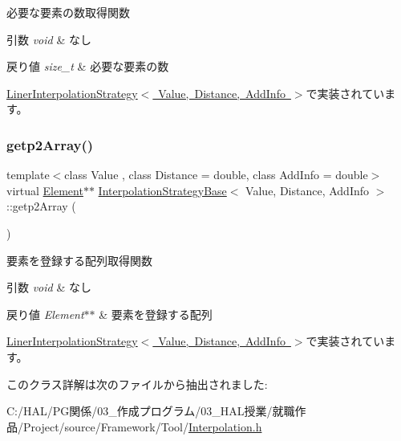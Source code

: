 必要な要素の数取得関数 


\begin{DoxyParams}{引数}
{\em void} & なし \\
\hline
\end{DoxyParams}

\begin{DoxyRetVals}{戻り値}
{\em size\+\_\+t} & 必要な要素の数 \\
\hline
\end{DoxyRetVals}


\mbox{\hyperlink{class_liner_interpolation_strategy_ab0685e841d7054a8e040e0d2b9fabc68}{Liner\+Interpolation\+Strategy$<$ Value, Distance, Add\+Info $>$}}で実装されています。

\mbox{\label{class_interpolation_strategy_base_aaccab96eb4f508e64a7a70f85c0e8d6a}} 
\subsubsection{\texorpdfstring{getp2\+Array()}{getp2Array()}}
{\footnotesize\ttfamily template$<$class Value , class Distance  = double, class Add\+Info  = double$>$ \\
virtual \mbox{\hyperlink{class_interpolation_strategy_base_abddda7a257538a53ad6030db831aab86}{Element}}$\ast$$\ast$ \mbox{\hyperlink{class_interpolation_strategy_base}{Interpolation\+Strategy\+Base}}$<$ Value, Distance, Add\+Info $>$\+::getp2\+Array (\begin{DoxyParamCaption}{ }\end{DoxyParamCaption})\hspace{0.3cm}{\ttfamily [pure virtual]}}



要素を登録する配列取得関数 


\begin{DoxyParams}{引数}
{\em void} & なし \\
\hline
\end{DoxyParams}

\begin{DoxyRetVals}{戻り値}
{\em Element$\ast$$\ast$} & 要素を登録する配列 \\
\hline
\end{DoxyRetVals}


\mbox{\hyperlink{class_liner_interpolation_strategy_af8be5242260b3ea8670fd393a04af500}{Liner\+Interpolation\+Strategy$<$ Value, Distance, Add\+Info $>$}}で実装されています。



このクラス詳解は次のファイルから抽出されました\+:\begin{DoxyCompactItemize}
\item 
C\+:/\+H\+A\+L/\+P\+G関係/03\+\_\+作成プログラム/03\+\_\+\+H\+A\+L授業/就職作品/\+Project/source/\+Framework/\+Tool/\mbox{\hyperlink{_interpolation_8h}{Interpolation.\+h}}\end{DoxyCompactItemize}
